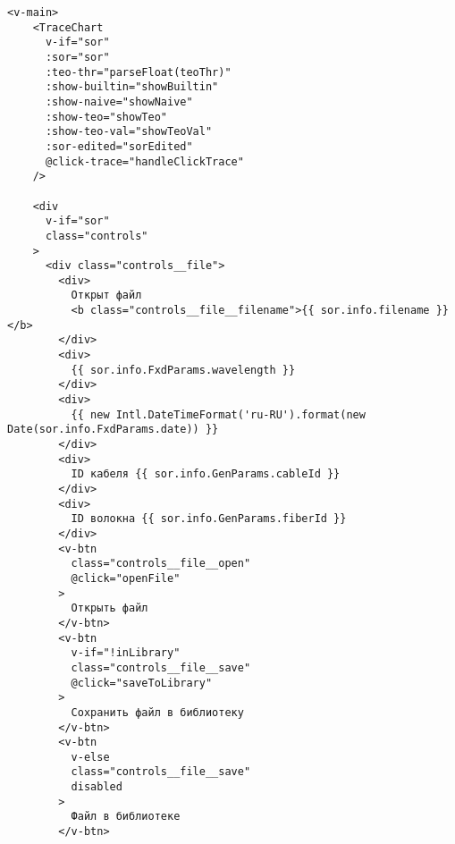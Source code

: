 \begin{lstlisting}[language=vue]
  <v-main>
    <TraceChart
      v-if="sor"
      :sor="sor"
      :teo-thr="parseFloat(teoThr)"
      :show-builtin="showBuiltin"
      :show-naive="showNaive"
      :show-teo="showTeo"
      :show-teo-val="showTeoVal"
      :sor-edited="sorEdited"
      @click-trace="handleClickTrace"
    />

    <div
      v-if="sor"
      class="controls"
    >
      <div class="controls__file">
        <div>
          Открыт файл
          <b class="controls__file__filename">{{ sor.info.filename }}</b>
        </div>
        <div>
          {{ sor.info.FxdParams.wavelength }}
        </div>
        <div>
          {{ new Intl.DateTimeFormat('ru-RU').format(new Date(sor.info.FxdParams.date)) }}
        </div>
        <div>
          ID кабеля {{ sor.info.GenParams.cableId }}
        </div>
        <div>
          ID волокна {{ sor.info.GenParams.fiberId }}
        </div>
        <v-btn
          class="controls__file__open"
          @click="openFile"
        >
          Открыть файл
        </v-btn>
        <v-btn
          v-if="!inLibrary"
          class="controls__file__save"
          @click="saveToLibrary"
        >
          Сохранить файл в библиотеку
        </v-btn>
        <v-btn
          v-else
          class="controls__file__save"
          disabled
        >
          Файл в библиотеке
        </v-btn>


\end{lstlisting}

